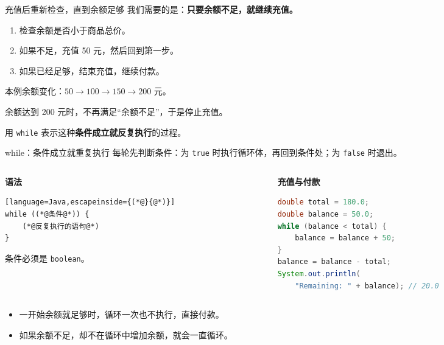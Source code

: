 \documentclass[aspectratio=169]{beamer}
\begin{document}
\begin{frame}{充值后重新检查，直到余额足够}
  我们需要的是：\textbf{只要余额不足，就继续充值。}
  \par\bigskip
  \begin{enumerate}
    \item 检查余额是否小于商品总价。
    \item 如果不足，充值 50 元，然后回到第一步。
    \item 如果已经足够，结束充值，继续付款。
  \end{enumerate}
  \bigskip
  本例余额变化：$50 \rightarrow 100 \rightarrow 150 \rightarrow 200$ 元。
  \par\medskip
  余额达到 200 元时，不再满足“余额不足”，于是停止充值。
  \par\medskip
  用 \texttt{while} 表示这种\textbf{条件成立就反复执行}的过程。
\end{frame}

\begin{frame}[fragile]{while：条件成立就重复执行}
  每轮先判断条件：为 \texttt{true} 时执行循环体，再回到条件处；为 \texttt{false} 时退出。
  \par\medskip
  \begin{columns}[T,onlytextwidth]
    \begin{column}{0.33\textwidth}
      \textbf{语法}
      \begin{lstlisting}[language=Java,escapeinside={(*@}{@*)}]
while ((*@条件@*)) {
    (*@反复执行的语句@*)
}
      \end{lstlisting}
      条件必须是 \texttt{boolean}。
    \end{column}
    \begin{column}{0.64\textwidth}
      \textbf{充值与付款}
      \begin{lstlisting}[language=Java]
double total = 180.0;
double balance = 50.0;
while (balance < total) {
    balance = balance + 50;
}
balance = balance - total;
System.out.println(
    "Remaining: " + balance); // 20.0
      \end{lstlisting}
    \end{column}
  \end{columns}
  \medskip
  \begin{itemize}
    \item 一开始余额就足够时，循环一次也不执行，直接付款。
    \item 如果余额不足，却不在循环中增加余额，就会一直循环。
  \end{itemize}
\end{frame}
\end{document}
